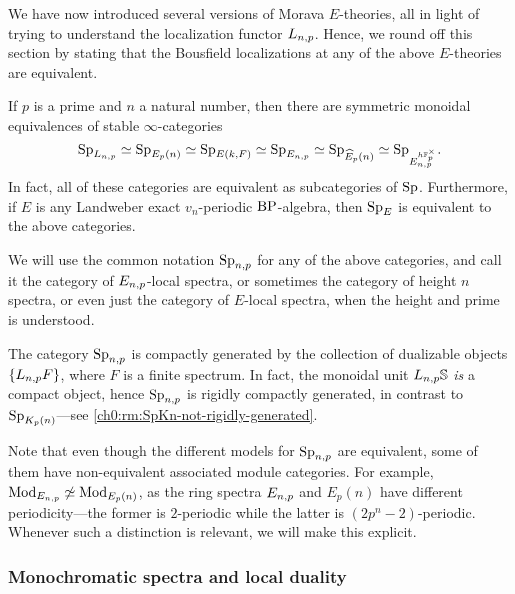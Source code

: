 We have now introduced several versions of Morava $E$-theories, all in light of trying to understand the localization functor $L_{n,p}$. Hence, we round off this section by stating that the Bousfield localizations at any of the above $E$-theories are equivalent. 

\begin{proposition}
    \label{ch0:prop:all-E-local-cats-are-equivalent}
    If $p$ is a prime and $n$ a natural number, then there are symmetric monoidal equivalences of stable $\infty$-categories 
    \[\mathrm{Sp}_{L_{n,p}} \simeq \mathrm{Sp}_{E_p(n)} \simeq \mathrm{Sp}_{E(k,F)}\simeq \mathrm{Sp}_{E_{n,p}} \simeq \mathrm{Sp}_{\widehat{E}_p(n)}\simeq \mathrm{Sp}_{E_{n,p}^{h\mathbb{F}_p^\times}}.\]
    In fact, all of these categories are equivalent as subcategories of $\mathrm{Sp}$. Furthermore, if $E$ is any Landweber exact $v_n$-periodic $\mathrm{BP}$-algebra, then $\mathrm{Sp}_E$ is equivalent to the above categories. 
\end{proposition}

\begin{notation}
    We will use the common notation $\mathrm{Sp}_{n,p}$ for any of the above categories, and call it the category of $E_{n,p}$-local spectra, or sometimes the category of height $n$ spectra, or even just the category of $E$-local spectra, when the height and prime is understood. 
\end{notation}

\begin{remark}
    The category $\mathrm{Sp}_{n,p}$ is compactly generated by the collection of dualizable objects $\{L_{n,p} F\}$, where $F$ is a finite spectrum. In fact, the monoidal unit $L_{n,p}\mathbb{S}$ \emph{is} a compact object, hence $\mathrm{Sp}_{n,p}$ is rigidly compactly generated, in contrast to $\mathrm{Sp}_{{K_p(n)}}$---see \cref{ch0:rm:SpKn-not-rigidly-generated}.
\end{remark}

\begin{remark}
    Note that even though the different models for $\mathrm{Sp}_{n,p}$ are equivalent, some of them have non-equivalent associated module categories. For example, $\mathrm{Mod}_{E_{n,p}}\not \simeq \mathrm{Mod}_{E_p(n)}$, as the ring spectra $E_{n,p}$ and $E_p(n)$ have different periodicity---the former is $2$-periodic while the latter is $(2p^n-2)$-periodic. Whenever such a distinction is relevant, we will make this explicit. 
\end{remark}





\subsubsection{Monochromatic spectra and local duality}
\label{ch0:sssec:monochromatic-duality}

